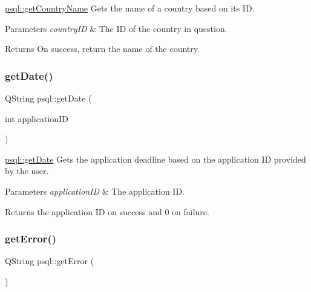 \mbox{\hyperlink{classpsql_a5724e9992e6a5c98524ab73b98f4202d}{psql\+::get\+Country\+Name}} Gets the name of a country based on its ID. 


\begin{DoxyParams}{Parameters}
{\em country\+ID} & The ID of the country in question. \\
\hline
\end{DoxyParams}
\begin{DoxyReturn}{Returns}
On success, return the name of the country. 
\end{DoxyReturn}
\mbox{\label{classpsql_a561f96bfe7e9d092077712dd6b186af8}} 
\subsubsection{\texorpdfstring{get\+Date()}{getDate()}}
{\footnotesize\ttfamily Q\+String psql\+::get\+Date (\begin{DoxyParamCaption}\item[{int}]{application\+ID }\end{DoxyParamCaption})}



\mbox{\hyperlink{classpsql_a561f96bfe7e9d092077712dd6b186af8}{psql\+::get\+Date}} Gets the application deadline based on the application ID provided by the user. 


\begin{DoxyParams}{Parameters}
{\em application\+ID} & The application ID. \\
\hline
\end{DoxyParams}
\begin{DoxyReturn}{Returns}
the application ID on success and 0 on failure. 
\end{DoxyReturn}
\mbox{\label{classpsql_a5f51e254b67ff932f287df2184ccc043}} 
\subsubsection{\texorpdfstring{get\+Error()}{getError()}}
{\footnotesize\ttfamily Q\+String psql\+::get\+Error (\begin{DoxyParamCaption}{ }\end{DoxyParamCaption})}




